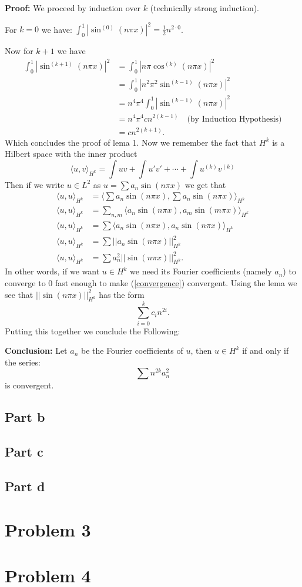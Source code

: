 \documentclass{article}
\begin{document}
\textbf{Proof:} We proceed by induction over $k$ (technically strong
induction).

For $k=0$ we have:
$\int_0^1 |\sin^{(0)}(n\pi x)|^2=\frac{1}{2}n^{2\cdot 0}$.

Now for $k+1$ we have
\begin{align*}
\int_0^1 |\sin^{(k+1)}(n\pi x)|^2
&= \int_0^1 |n\pi\cos^{(k)}(n\pi x)|^2\\
&= \int_0^1 |n^2\pi^2\sin^{(k-1)}(n\pi x)|^2\\
&= n^4\pi^4\int_0^1 |\sin^{(k-1)}(n\pi x)|^2\\
&= n^4\pi^4cn^{2(k-1)} \quad \text{(by Induction Hypothesis)}\\
&= cn^{2(k+1)}.
\end{align*}
Which concludes the proof of lema 1.
Now we remember the fact that $H^k$ is a Hilbert space with the inner product
\[
	\langle u,v\rangle_{H^k} = \int uv + \int u'v' + \cdots + \int u^{(k)}v^{(k)}
\]
Then if we write $u\in L^2$ as $u=\sum a_n\sin(n\pi x)$ we get that
\begin{align}
	\langle u,u\rangle_{H^k} &= \Big\langle \sum a_n\sin(n\pi x), \sum a_n\sin(n\pi x) \Big\rangle_{H^k}\nonumber\\
	\langle u,u\rangle_{H^k} &= \sum_{n,m}\langle a_n\sin(n\pi x),
	a_m\sin(m\pi x) \rangle_{H^k}\nonumber\\
	\langle u,u\rangle_{H^k} &= \sum\langle a_n\sin(n\pi x), a_n\sin(n\pi x) \rangle_{H^k}\nonumber\\
	\langle u,u\rangle_{H^k} &= \sum ||a_n\sin(n\pi x)||^2_{H^k}\nonumber\\
	\langle u,u\rangle_{H^k} &= \sum a_n^2||\sin(n\pi x)||^2_{H^k}\label{convergence}.
\end{align}
In other words, if we want $u\in H^k$ we need its Fourier coefficients (namely
$a_n$) to converge to 0 fast enough to make (\ref{convergence}) convergent.
Using the lema we see that $||\sin(n \pi x)||^2_{H^k}$ has the form
\[
	\sum_{i=0}^k c_in^{2i}.
\]
Putting this together we conclude the Following:

\textbf{Conclusion:} Let $a_n$ be the Fourier coefficients of $u$, then $u\in
H^k$ if and only if the series:
\[
	\sum n^{2k}a_n^2
\]
is convergent.
\subsection{Part b}
\subsection{Part c}
\subsection{Part d}
\section{Problem 3}
\section{Problem 4}
\end{document}
